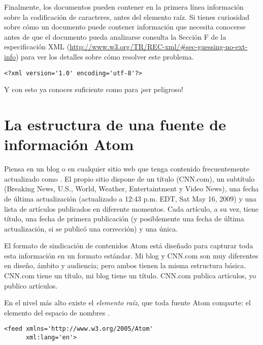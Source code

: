 Finalmente, los documentos  pueden contener en la primera línea información sobre la codificación de caracteres, antes del elemento raíz. Si tienes curiosidad sobre cómo un documento puede contener información que necesita conocerse antes de que el documento pueda analizarse consulta la Sección F de la especificación XML (\href{http://www.w3.org/TR/REC-xml/\#sec-guessing-no-ext-info}{http://www.w3.org/TR/REC-xml/\#sec-guessing-no-ext-info}) para ver los detalles sobre cómo resolver este problema.

\noindent\begin{minipage}{\textwidth}
\begin{lstlisting}[mathescape=True]
<?xml version='1.0' encoding='utf-8'?>
\end{lstlisting}
\end{minipage}

Y con esto ya conoces suficiente  como para ¡ser peligroso!

\section{La estructura de una fuente de información Atom}

Piensa en un blog o en cualquier sitio web que tenga contenido frecuentemente actualizado como . El propio sitio dispone de un título (CNN.com), un subtítulo (Breaking News, U.S., World, Weather, Entertaintment y Video News), una fecha de última actualización (actualizado a 12:43 p.m. EDT, Sat May 16, 2009) y una lista de artículos publicados en diferente momentos. Cada artículo, a su vez, tiene título, una fecha de primera publicación (y posiblemente una fecha de última actualización, si se publicó una corrección) y una  única.

El formato de sindicación de contenidos Atom está diseñado para capturar toda esta información en un formato estándar. Mi blog y CNN.com son muy diferentes en diseño, ámbito y audiencia; pero ambos tienen la misma estructura básica. CNN.com tiene un título, mi blog tiene un título. CNN.com publica artículos, yo publico artículos.

En el nivel más alto existe el \emph{elemento raíz}, que toda fuente Atom comparte: el elemento  del espacio de nombres .

\noindent\begin{minipage}{\textwidth}
\begin{lstlisting}[mathescape=True]
<feed xmlns='http://www.w3.org/2005/Atom'
      xml:lang='en'>
\end{lstlisting}
\end{minipage}

